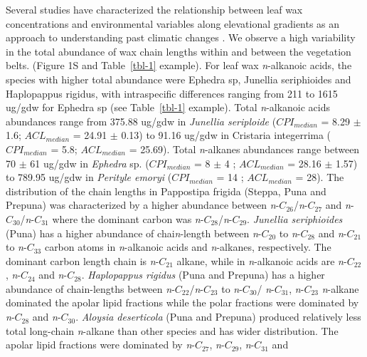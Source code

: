 \documentclass[
  authoryear,
  preprint,
  3p]{elsarticle}
\begin{document}
Several studies have characterized the relationship between leaf wax
concentrations and environmental variables along elevational gradients
as an approach to understanding past climatic changes
\citep{cerda-penaMolecularNalkylLeaf2020, feakinsProductionLeafWax2016, jansenStraightchainLipidBiomarker2006, nieto-morenoElevationdependentChangesNalkane2016, shepherdEffectsStressPlant2006}.
We observe a high variability in the total abundance of wax chain
lengths within and between the vegetation belts. (Figure 1S and
Table~\ref{tbl-1} example). For leaf wax \emph{n}-alkanoic acids, the
species with higher total abundance were Ephedra sp, Junellia
seriphioides and Haplopappus rigidus, with intraspecific differences
ranging from 211 to 1615 ug/gdw for Ephedra sp (see Table~\ref{tbl-1}
example). Total \emph{n}-alkanoic acids abundances range from 375.88
ug/gdw in \emph{Junellia seriploide} (\(CPI_{median}\) = 8.29 \(\pm\)
1.6; \(ACL_{median}\) = 24.91 \(\pm\) 0.13) to 91.16 ug/gdw in Cristaria
integerrima (\(CPI_{median}\) = 5.8; \(ACL_{median}\) = 25.69). Total
\emph{n}-alkanes abundances range between 70 \(\pm\) 61 ug/gdw in
\emph{Ephedra} sp. (\(CPI_{median}\) = 8 \(\pm\) 4 ; \(ACL_{median}\) =
28.16 \(\pm\) 1.57) to 789.95 ug/gdw in \emph{Perityle emoryi}
(\(CPI_{median}\) = 14 ; \(ACL_{median}\) = 28). The distribution of the
chain lengths in Pappostipa frigida (Steppa, Puna and Prepuna) was
characterized by a higher abundance between
\emph{n}-\(C_{26}\)/\emph{n}-\(C_{27}\) and
\emph{n}-\(C_{30}\)/\emph{n}-\(C_{31}\) where the dominant carbon was
\emph{n}-\(C_{28}\)/\emph{n}-\(C_{29}\). \emph{Junellia seriphioides}
(Puna) has a higher abundance of chai\emph{n}-length between
\emph{n}-\(C_{20}\) to \emph{n}-\(C_{28}\) and \emph{n}-\(C_{21}\) to
\emph{n}-\(C_{33}\) carbon atoms in \emph{n}-alkanoic acids and
\emph{n}-alkanes, respectively. The dominant carbon length chain is
\emph{n}-\(C_{21}\) alkane, while in \emph{n}-alkanoic acids are
\emph{n}-\(C_{22}\), \emph{n}-\(C_{24}\) and \emph{n}-\(C_{28}\).
\emph{Haplopappus rigidus} (Puna and Prepuna) has a higher abundance of
chain-lengths between \emph{n}-\(C_{22}\)/\emph{n}-\(C_{23}\) to
\emph{n}-\(C_{30}\)/ \emph{n}-\(C_{31}\), \emph{n}-\(C_{23}\)
\emph{n}-alkane dominated the apolar lipid fractions while the polar
fractions were dominated by \emph{n}-\(C_{28}\) and \emph{n}-\(C_{30}\).
\emph{Aloysia deserticola} (Puna and Prepuna) produced relatively less
total long-chain \emph{n}-alkane than other species and has wider
distribution. The apolar lipid fractions were dominated by
\emph{n}-\(C_{27}\), \emph{n}-\(C_{29}\), \emph{n}-\(C_{31}\) and
\end{document}
